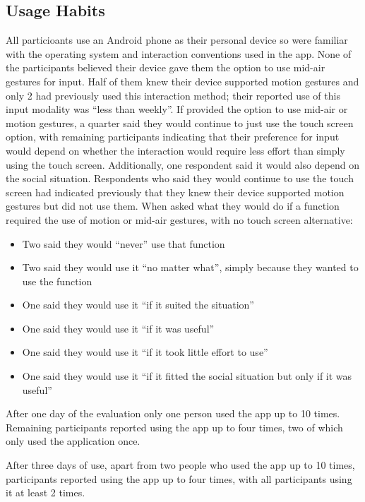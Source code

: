 \documentclass{l4proj}
\begin{document}
\subsection{Usage Habits}

All particioants use an Android phone as their personal device so were familiar with the operating system and interaction conventions used in the app. None of the participants believed their device gave them the option to use mid-air gestures for input. Half of them knew their device supported motion gestures and only 2 had previously used this interaction method; their reported use of this input modality was ``less than weekly''. If provided the option to use mid-air or motion gestures, a quarter said they would continue to just use the touch screen option, with remaining participants indicating that their preference for input would depend on whether the interaction would require less effort than simply using the touch screen. Additionally, one respondent said it would also depend on the social situation. Respondents who said they would continue to use the touch screen had indicated previously that they knew their device supported motion gestures but did not use them. When asked what they would do if a function required the use of motion or mid-air gestures, with no touch screen alternative:\begin{itemize}
    \item Two said they would ``never'' use that function
    \item Two said they would use it ``no matter what'', simply because they wanted to use the function
    \item One said they would use it ``if it suited the situation''
    \item One said they would use it ``if it was useful''
    \item One said they would use it ``if it took little effort to use''
    \item One said they would use it ``if it fitted the social situation but only if it was useful''
\end{itemize}

After one day of the evaluation only one person used the app up to 10 times. Remaining participants reported using the app up to four times, two of which only used the application once. 

After three days of use, apart from two people who used the app up to 10 times, participants reported using the app up to four times, with all participants using it at least 2 times. 
\end{document}
